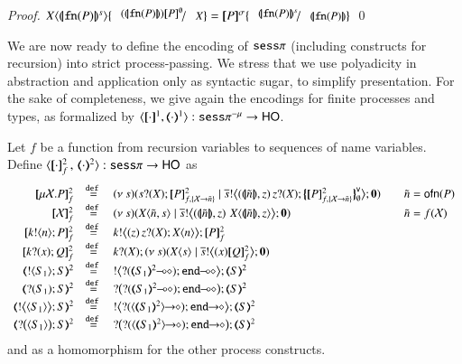 \begin{proof}
	$\appl{X}{\smap{\fn{P}}} \subst{(\vmap{\fn{P}}) \map{P}^{\emptyset}}{X} =
	\map{P}^{\sigma} \subst{\smap{\fn{P}}}{\vmap{\fn{P}}}$ 
	\qed
\end{proof}

We are now ready to define the encoding of $\mathtt{sess}\pi$
(including constructs for recursion) into strict process-passing.
We stress that we use polyadicity in abstraction and application only
as syntactic sugar, to simplify presentation.
For the sake of completeness, we give again the encodings for 
finite processes and types, as
formalized by $\encod{\cdot}{\cdot}{1}: \sespnr \to \HO$.

\begin{definition}\rm
	Let $f$ be a function from recursion variables to sequences of name variables.
	Define $\fencod{\cdot}{\cdot}{2}{f}: \sesp \to \HO$ as
%
\[
	\begin{array}{rcll}
		\pmapp{\recp{X}{P}}{2}{f} &\defeq& \newsp{s}{\binp{s}{\X} \pmapp{P}{2}{{f,\{\rvar{X}\to \tilde{n}\}}} \Par \bbout{\dual{s}}{\abs{\vmap{\tilde{n}}, z } \,{\binp{z}{\X} \auxmapp{\pmapp{P}{2}{{f,\{\rvar{X}\to \tilde{n}\}}}}{\mathsf{v}}{\es}}} \inact} & \quad \tilde{n} = \ofn{P} \\ 
		\pmapp{\rvar{X}}{2}{f} &\defeq& \newsp{s}{\appl{\X}{\tilde{n}, s} \Par \bbout{\dual{s}}{ \abs{\vmap{\tilde{n}},z}\,\,{\appl{X}{ \vmap{\tilde{n}}, z}}} \inact} & \quad \tilde{n} = f(\rvar{X}) \\
		\pmapp{\bout{k}{n} P}{2}{f}	&\defeq&	\bbout{k}{ \abs{z}{\,\binp{z}{X} \appl{X}{n}} } \pmapp{P}{2}{f} \\
		\pmapp{\binp{k}{x} Q}{2}{f}	&\defeq&	\binp{k}{X} \newsp{s}{\appl{X}{s} \Par \bbout{\dual{s}}{\abs{x} \pmapp{Q}{2}{f}} \inact} \\
		\tmap{\btout{S_1} {S} }{2}	&\defeq&	\bbtout{\lhot{\btinp{\lhot{\tmap{S_1}{2}}}\tinact}} \tmap{S}{2}  \\
		\tmap{\btinp{S_1} S }{2}	&\defeq&	\bbtinp{\lhot{\btinp{\lhot{\tmap{S_1}{2}}}\tinact}} \tmap{S}{2} \\
		\tmap{\bbtout{\chtype{S_1}} {S} }{2}	&\defeq&	\bbtout{\shot{\btinp{\shot{\chtype{\tmap{S_1}{2}}}}\tinact}} \tmap{S}{2}  \\
		\tmap{\bbtinp{\chtype{S_1}} {S} }{2}	&\defeq&	\bbtinp{\shot{\btinp{\shot{\chtype{\tmap{S_1}{2}}}}\tinact}} \tmap{S}{2}
	\end{array}
\]
%
and as a homomorphism for the other process constructs. 
\end{definition}

